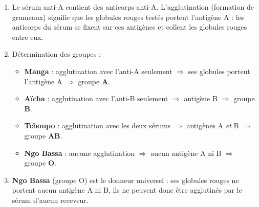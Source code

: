 \documentclass[11pt]{article}
\newcommand{\cle}[1]{{\popxbold\color{popdark}#1}}
\begin{document}
\begin{corrige}
\begin{enumerate}
\item Le sérum anti-A contient des \cle{anticorps} anti-A. L'agglutination (formation de grumeaux) signifie que les globules rouges testés portent l'\cle{antigène} A : les anticorps du sérum se fixent sur ces antigènes et collent les globules rouges entre eux.
\item Détermination des groupes :
\begin{itemize}
\item \textbf{Manga} : agglutination avec l'anti-A seulement $\Rightarrow$ ses globules portent l'antigène A $\Rightarrow$ groupe \textbf{A}.
\item \textbf{Aïcha} : agglutination avec l'anti-B seulement $\Rightarrow$ antigène B $\Rightarrow$ groupe \textbf{B}.
\item \textbf{Tchoupo} : agglutination avec les deux sérums $\Rightarrow$ antigènes A \emph{et} B $\Rightarrow$ groupe \textbf{AB}.
\item \textbf{Ngo Bassa} : aucune agglutination $\Rightarrow$ aucun antigène A ni B $\Rightarrow$ groupe \textbf{O}.
\end{itemize}
\item \textbf{Ngo Bassa} (groupe O) est le donneur universel : ses globules rouges ne portent aucun antigène A ni B, ils ne peuvent donc être agglutinés par le sérum d'aucun receveur.
\end{enumerate}
\end{corrige}
\end{document}
